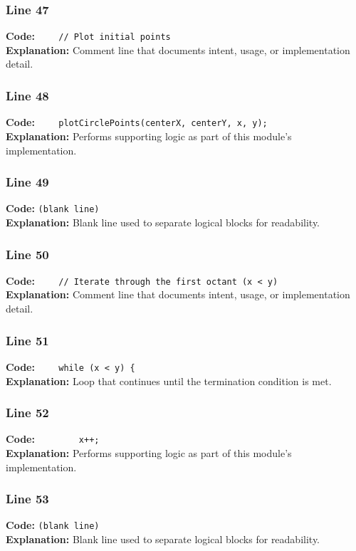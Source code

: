 \documentclass[11pt,a4paper]{article}
\begin{document}
\subsubsection*{Line 47}
\textbf{Code:} \verb|    // Plot initial points|\\
\textbf{Explanation:} Comment line that documents intent, usage, or implementation detail.

\subsubsection*{Line 48}
\textbf{Code:} \verb|    plotCirclePoints(centerX, centerY, x, y);|\\
\textbf{Explanation:} Performs supporting logic as part of this module's implementation.

\subsubsection*{Line 49}
\textbf{Code:} \texttt{(blank line)}\\
\textbf{Explanation:} Blank line used to separate logical blocks for readability.

\subsubsection*{Line 50}
\textbf{Code:} \verb|    // Iterate through the first octant (x < y)|\\
\textbf{Explanation:} Comment line that documents intent, usage, or implementation detail.

\subsubsection*{Line 51}
\textbf{Code:} \verb|    while (x < y) {|\\
\textbf{Explanation:} Loop that continues until the termination condition is met.

\subsubsection*{Line 52}
\textbf{Code:} \verb|        x++;|\\
\textbf{Explanation:} Performs supporting logic as part of this module's implementation.

\subsubsection*{Line 53}
\textbf{Code:} \texttt{(blank line)}\\
\textbf{Explanation:} Blank line used to separate logical blocks for readability.
\end{document}

